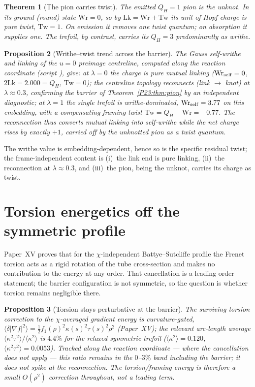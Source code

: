 \documentclass[11pt,a4paper]{article}
\newtheorem{theorem}{Theorem}[section]
\newtheorem{proposition}[theorem]{Proposition}
\theoremstyle{definition}\newtheorem{definition}[theorem]{Definition}
\newcommand{\QH}{Q_H}
\newcommand{\Wr}{\mathrm{Wr}}
\newcommand{\Tw}{\mathrm{Tw}}
\newcommand{\Lk}{\mathrm{Lk}}
\begin{document}
\begin{theorem}[The pion carries twist]
\label{P23:thm:calugareanu}
The emitted $\QH=1$ pion is the unknot. In its ground (round) state $\Wr=0$, so by
$\Lk=\Wr+\Tw$ its unit of Hopf charge is pure \emph{twist}, $\Tw=1$. On emission it removes one
twist quantum; on absorption it supplies one. The trefoil, by contrast, carries its $\QH=3$
predominantly as writhe.
\end{theorem}

\begin{proposition}[Writhe--twist trend across the barrier]
\label{P23:prop:wrtw}
The Gauss self-writhe and linking of the $u=0$ preimage centreline, computed along the reaction
coordinate (script ), give: at $\lambda=0$ the charge is pure mutual
linking ($\Wr_{\rm self}=0$, $2\Lk=2.000=\QH$, $\Tw=0$); the centreline topology reconnects
(link $\to$ knot) at $\lambda\approx0.3$, confirming the barrier of
Theorem~\ref{P23:thm:pion} by an independent diagnostic; at $\lambda=1$ the single trefoil is
writhe-dominated, $\Wr_{\rm self}=3.77$ on this embedding, with a compensating framing twist
$\Tw=\QH-\Wr=-0.77$. The reconnection thus converts mutual linking into self-writhe while the net
charge rises by exactly $+1$, carried off by the unknotted pion as a twist quantum.
\end{proposition}

The writhe value is embedding-dependent, hence so is the specific residual twist; the
frame-independent content is (i)~the link end is pure linking, (ii)~the reconnection at
$\lambda\approx0.3$, and (iii)~the pion, being the unknot, carries its charge as twist.

\section{Torsion energetics off the symmetric profile}
\label{P23:sec:torsion}
Paper~XV proves that for the $\chi$-independent Battye--Sutcliffe profile the Frenet torsion acts
as a rigid rotation of the tube cross-section and makes no contribution to the energy at any
order. That cancellation is a leading-order statement; the barrier configuration is not symmetric,
so the question is whether torsion remains negligible there.

\begin{proposition}[Torsion stays perturbative at the barrier]
\label{P23:prop:torsion}
The surviving torsion correction to the $\chi$-averaged gradient energy is curvature-gated,
$\langle\delta|\nabla f|^2\rangle=\tfrac12 f_1(\rho)^2\kappa(s)^2\tau(s)^2\rho^2$ (Paper~XV); the
relevant arc-length average $\langle\kappa^2\tau^2\rangle/\langle\kappa^2\rangle$ is $4.4\%$ for
the relaxed symmetric trefoil ($\langle\kappa^2\rangle=0.120$,
$\langle\kappa^2\tau^2\rangle=0.0053$). Tracked along the reaction coordinate --- where the
cancellation does not apply --- this ratio remains in the $0$--$3\%$ band \emph{including} the
barrier; it does not spike at the reconnection. The torsion/framing energy is therefore a small
$O(\rho^2)$ correction throughout, not a leading term.
\end{proposition}
\end{document}
